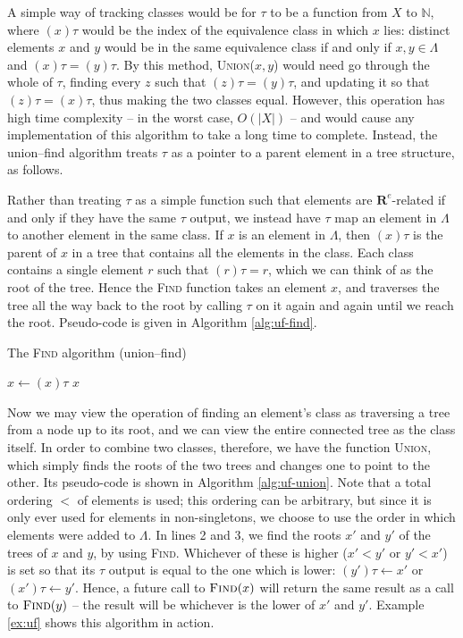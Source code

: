A simple way of tracking classes would be for $\tau$ to be a function from $X$
to $\mathbb{N}$, where $(x)\tau$ would be the index of the equivalence class in
which $x$ lies: distinct elements $x$ and $y$ would be in the same equivalence
class if and only if $x,y \in \Lambda$ and $(x)\tau = (y)\tau$.  By this method,
\textsc{Union($x,y$)} would need go through the whole of $\tau$, finding every
$z$ such that $(z)\tau = (y)\tau$, and updating it so that $(z)\tau = (x)\tau$,
thus making the two classes equal.  However, this operation has high time
complexity -- in the worst case, $O(|X|)$ -- and would cause any implementation
of this algorithm to take a long time to complete.  Instead, the union--find
algorithm treats $\tau$ as a pointer to a parent element in a tree structure, as
follows.

Rather than treating $\tau$ as a simple function such that elements are
$\mathbf{R}^e$-related if and only if they have the same $\tau$ output,
we instead have $\tau$ map an element in $\Lambda$ to another element in the
same class.  If $x$ is an element in $\Lambda$, then $(x)\tau$ is the parent of
$x$ in a tree that contains all the elements in the class.  Each class contains a
single element $r$ such that $(r)\tau = r$, which we can think of as the root of
the tree.  Hence the \textsc{Find} function takes an element $x$, and traverses
the tree all the way back to the root by calling $\tau$
on it again and again until we reach the root.
Pseudo-code is given in Algorithm \ref{alg:uf-find}.

\begin{algorithm}
\caption{The \textsc{Find} algorithm (union--find)}
\label{alg:uf-find}
  \begin{algorithmic}[1]
      \Repeat
        \State $x \gets (x)\tau$  
        
      \State \Return $x$
    \EndProcedure
  \end{algorithmic}
\end{algorithm}

Now we may view the operation of finding an element's class as traversing a tree
from a node up to its root, and we can view the entire connected tree as the
class itself.  In order to combine two classes, therefore, we have the function
\textsc{Union}, which simply finds the roots of the two trees and changes one to
point to the other.  Its pseudo-code is shown in Algorithm \ref{alg:uf-union}.
Note that a total ordering $<$ of elements is used; this ordering can be
arbitrary, but since it is only ever used for elements in non-singletons, we
choose to use the order in which elements were added to $\Lambda$.  In
lines 2 and 3, we find the roots $x'$ and $y'$ of the trees of $x$ and $y$, by
using \textsc{Find}.  Whichever of these is higher ($x' < y'$ or $y' < x'$) is
set so that its $\tau$ output is equal to the one which is lower:
$(y')\tau \gets x'$ or $(x')\tau \gets y'$.  Hence, a future call to
$\textsc{Find}(x)$ will return the same result as a call to $\textsc{Find}(y)$
-- the result will be whichever is the lower of $x'$ and $y'$.  Example
\ref{ex:uf} shows this algorithm in action.

